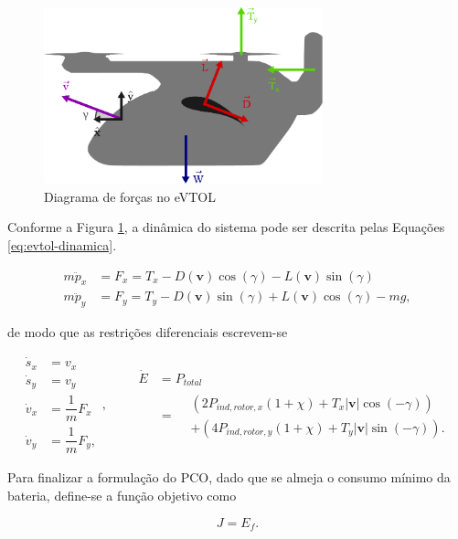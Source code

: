 \begin{figure}[H]
    \centering
    \includegraphics[width=0.72\textwidth]{Cap3/figuras/eVTOL.pdf}
    \caption{Diagrama de forças no eVTOL}
    \label{fig:evtol-forças}
\end{figure}

Conforme a Figura \ref{fig:evtol-forças}, a dinâmica do sistema pode ser descrita pelas Equações \ref{eq:evtol-dinamica}.

\begin{equation}
\begin{aligned}
    m\ddot{p}_x &= F_x = T_x - D(\mathbf{v}) \cos(\gamma) - L(\mathbf{v}) \sin(\gamma) \\
    m\ddot{p}_y &= F_y = T_y - D(\mathbf{v}) \sin(\gamma) + L(\mathbf{v}) \cos(\gamma) - mg,
\end{aligned}
\label{eq:evtol-dinamica}
\end{equation}

\noindent de modo que as restrições diferenciais escrevem-se

\begin{equation}
\begin{aligned}
    \dot{s}_x &= v_x \\
    \dot{s}_y &= v_y \\
    \dot{v}_x &= \dfrac{1}{m} F_x \\
    \dot{v}_y &= \dfrac{1}{m} F_y,
\end{aligned},
\qquad
\begin{aligned}
    \dot{E}
    &= P_{total} \\
    &=
    \begin{aligned}
        &\left( 2 P_{ind,rotor,x} (1 + \chi) + T_x |\mathbf{v}| \cos(-\gamma) \right) \\
        &+ \left( 4 P_{ind,rotor,y} (1 + \chi) + T_y |\mathbf{v}| \sin(-\gamma) \right).
    \end{aligned}
\end{aligned}
\label{eq:evtol-restricoes-diferenciais}
\end{equation}


Para finalizar a formulação do PCO, dado que se almeja o consumo mínimo da bateria, define-se a função objetivo como

\begin{equation}
    J = E_f.
    \label{eq:evtol-J}
\end{equation}

